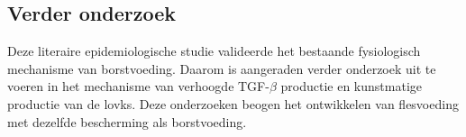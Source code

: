 \documentclass[table,abstract=true]{scrartcl}
\begin{document}
\subsection{Verder onderzoek}
Deze literaire epidemiologische studie valideerde het bestaande fysiologisch mechanisme van borstvoeding. Daarom is aangeraden verder onderzoek uit te voeren in het mechanisme van verhoogde TGF-$\beta$ productie en kunstmatige productie van de \glspl{lovk}. Deze onderzoeken beogen het ontwikkelen van flesvoeding met dezelfde bescherming als borstvoeding.

\printglossaries
\newpage
\printbibliography 
\end{document}
